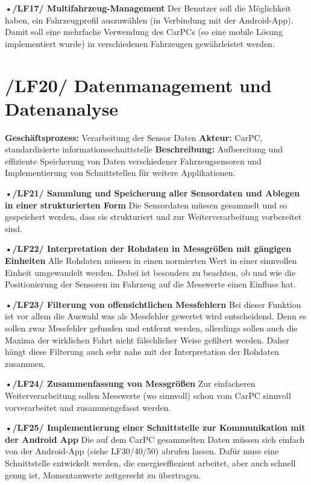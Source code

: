 \textbf{•/LF17/ Multifahrzeug-Management}
Der Benutzer soll die Möglichkeit haben, ein Fahrzeugprofil auszuwählen (in Verbindung mit der Android-App). Damit soll eine mehrfache Verwendung des CarPCs (so eine mobile Lösung implementiert wurde) in verschiedenen Fahrzeugen gewährleistet werden.

\section{/LF20/ Datenmanagement und Datenanalyse}
\textbf{Geschäftsprozess:}	Verarbeitung der Sensor Daten
\newline
\textbf{Akteur:}		CarPC, standardisierte informationsschnittstelle
\newline
\textbf{Beschreibung:} Aufbereitung und effiziente Speicherung von Daten verschiedener Fahrzeugsensoren und Implementierung von Schnittstellen für weitere Applikationen. 

\textbf{•/LF21/ Sammlung und Speicherung aller Sensordaten und Ablegen in einer strukturierten Form}
Die Sensordaten müssen gesammelt und so gespeichert werden, dass sie strukturiert und zur Weiterverarbeitung vorbereitet sind.

\textbf{•/LF22/ Interpretation der Rohdaten in Messgrößen mit gängigen Einheiten}
Alle Rohdaten müssen in einen normierten Wert in einer sinnvollen Einheit umgewandelt werden. Dabei ist besonders zu beachten, ob und wie die Positionierung der Sensoren im Fahrzeug auf die Messwerte einen Einfluss hat.

\textbf{•/LF23/ Filterung von offensichtlichen Messfehlern}
Bei dieser Funktion ist vor allem die Auswahl was als Messfehler gewertet wird entscheidend. Denn es sollen zwar Messfehler gefunden und entfernt werden, allerdings sollen auch die Maxima der wirklichen Fahrt nicht fälschlicher Weise gefiltert werden. Daher hängt diese Filterung auch sehr nahe mit der Interpretation der Rohdaten zusammen.

\textbf{•/LF24/ Zusammenfassung von Messgrößen}
Zur einfacheren Weiterverarbeitung sollen Messwerte (wo sinnvoll) schon vom CarPC sinnvoll vorverarbeitet und zusammengefasst werden.

\textbf{•/LF25/ Implementierung einer Schnittstelle zur Kommunikation mit der Android App}
Die auf dem CarPC gesammelten Daten müssen sich einfach von der Android-App (siehe LF30/40/50) abrufen lassen. Dafür muss eine Schnittstelle entwickelt werden, die energieeffiezient arbeitet, aber auch schnell genug ist, Momentanwerte zeitgerecht zu übertragen.


